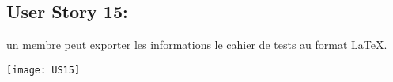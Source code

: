 \newpage{}
\subsection{User Story 15:}
un membre peut exporter les informations le cahier de tests au format \LaTeX{}.


  \begin{center}
        \texttt{[image: US15]}
  \end{center}